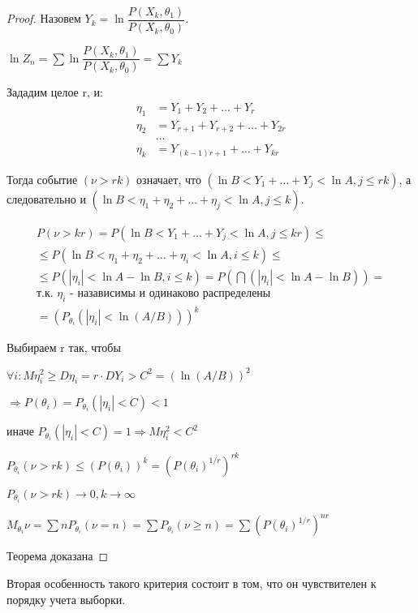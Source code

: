 \begin{proof}
  Назовем $Y_k = \ln \dfrac{P(X_k, \theta_1)}{P(X_k, \theta_0)}$.

  $\ln Z_n = \sum \ln \dfrac{P(X_k, \theta_1)}{P(X_k, \theta_0)} = \sum Y_k$

  Зададим целое r, и:
  \begin{align*}
    \eta_1 &= Y_1 + Y_2 + \dots + Y_r \\
    \eta_2 &= Y_{r+1} + Y_{r+2} + \dots + Y_{2r} \\
           &\dots \\
    \eta_k &= Y_{(k-1) r + 1} + \dots + Y_{kr}
  \end{align*}

  Тогда событие $(\nu > rk)$ означает, что $(\ln B < Y_1 + \dots + Y_j < \ln A, j \leqslant rk)$, а следовательно и $(\ln B < \eta_1 + \eta_2 + \dots + \eta_j < \ln A, j \leqslant k)$.

  \begin{multline*}
    P(\nu > kr) = P(\ln B < Y_1 + \dots + Y_j < \ln A, j \leqslant kr) \leqslant \\
    \leqslant P(\ln B < \eta_1 + \eta_2 + \dots + \eta_i < \ln A, i \leqslant k) \leqslant \\
    \leqslant P(|\eta_i| < \ln A - \ln B, i \leqslant k)
    = P(\bigcap (|\eta_i| < \ln A - \ln B)) = \\
    \text{т.к. $\eta_i$ - назависимы и одинаково распределены} \\
    = (P_{\theta_i} (|\eta_i| < \ln (A/B)))^k
  \end{multline*}


  Выбираем r так, чтобы
  
  $\forall i : M \eta_i^2 \geqslant D \eta_i = r \cdot D Y_i > C^2 = (\ln (A/B))^2$
  
  $\Rightarrow P(\theta_i) = P_{\theta_i} (|\eta_i| < C) < 1$

  иначе $P_{\theta_i} (|\eta_i| < C) = 1 \Rightarrow M \eta_i^2 < C^2$

  $P_{\theta_i} (\nu > rk) \leqslant (P(\theta_i))^k = (P(\theta_i)^{1/r})^{rk}$

  $P_{\theta_i} (\nu > rk) \to 0, k \to \infty$

  $M_{\theta_i} \nu = \sum n P_{\theta_i} (\nu  = n) = \sum P_{\theta_i} (\nu \geqslant n) = \sum ( P(\theta_i)^{1/r} )^{nr}$

  Теорема доказана
\end{proof}

Вторая особенность такого критерия состоит в том, что он чувствителен к порядку учета выборки.

